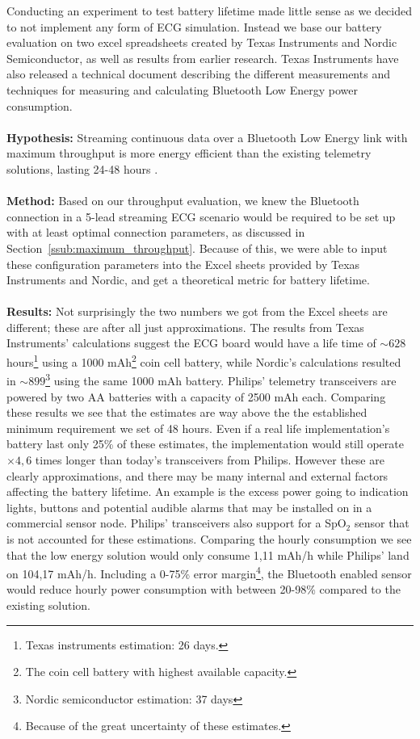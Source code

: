 Conducting an experiment to test battery lifetime made little sense as we decided to not implement any form of ECG simulation. Instead we base our battery evaluation on two excel spreadsheets created by Texas Instruments and Nordic Semiconductor, as well as results from earlier research. Texas Instruments have also released a technical document \cite{TIbatteryCalculations} describing the different measurements and techniques for measuring and calculating Bluetooth Low Energy power consumption.
\\
\\
\noindent %
\textbf{Hypothesis:} Streaming continuous data over a Bluetooth Low Energy link with maximum throughput is more energy efficient than the existing telemetry solutions, lasting 24-48 hours \cite{philipsIntellivueTrancievers}.
\\
\\
\noindent
\textbf{Method:} Based on our throughput evaluation, we knew the Bluetooth connection in a 5-lead streaming ECG scenario would be required to be set up with at least optimal connection parameters, as discussed in Section~\ref{ssub:maximum_throughput}. Because of this, we were able to input these configuration parameters into the Excel sheets provided by Texas Instruments and Nordic, and get a theoretical metric for battery lifetime.
\\
\\
\noindent
\textbf{Results:} 
Not surprisingly the two numbers we got from the Excel sheets are different; these are after all just approximations. The results from Texas Instruments' calculations suggest the ECG board would have a life time of $\sim628$ hours\footnote{ Texas instruments estimation: 26 days.} using a 1000 mAh\footnote{ The coin cell battery with highest available capacity.} coin cell battery, while Nordic's calculations resulted in $\sim899$\footnote{ Nordic semiconductor estimation: 37 days} using the same 1000 mAh battery. Philips' telemetry transceivers are powered by two AA batteries with a capacity of 2500 mAh each. Comparing these results we see that the estimates are way above the the established minimum requirement we set of 48 hours. Even if a real life implementation's battery last only 25\% of these estimates, the implementation would still operate $\times 4,6$ times longer than today's transceivers from Philips. However these are clearly approximations, and there may be many internal and external factors affecting the battery lifetime. An example is the excess power going to indication lights, buttons and potential audible alarms that may be installed on in a commercial sensor node. Philips' transceivers also support for a SpO$_2$ sensor that is not accounted for these estimations. Comparing the hourly consumption we see that the low energy solution would only consume 1,11 mAh/h while Philips' land on 104,17 mAh/h. Including a 0-75\% error margin\footnote{ Because of the great uncertainty of these estimates.}, the Bluetooth enabled sensor would reduce hourly power consumption with between 20-98\% compared to the existing solution.


